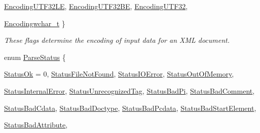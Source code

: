 \begin{DoxyCompactItemize}
\hyperlink{namespacephys_1_1xml_a420f5de782438f88160321385bea2015a127752883aaf8c9bdb5f66ec725211fc}{EncodingUTF32LE}, 
\hyperlink{namespacephys_1_1xml_a420f5de782438f88160321385bea2015a5fb13deaf1552b0f4c00e2b8cafce0b9}{EncodingUTF32BE}, 
\hyperlink{namespacephys_1_1xml_a420f5de782438f88160321385bea2015ac61c2f632bd66c2466c29783beb33f8a}{EncodingUTF32}, 
\par
\hyperlink{namespacephys_1_1xml_a420f5de782438f88160321385bea2015a2bc9c8d42796901c8feaa25e17c56cef}{Encodingwchar\_\-t}
 \}
\begin{DoxyCompactList}\small\item\em These flags determine the encoding of input data for an XML document. \item\end{DoxyCompactList}\item 
enum \hyperlink{namespacephys_1_1xml_ae7aabb879b21c73d8183a54470f8917f}{ParseStatus} \{ \par
\hyperlink{namespacephys_1_1xml_ae7aabb879b21c73d8183a54470f8917fa9ea9b3eecb4bb9f01745c94150982560}{StatusOk} =  0, 
\hyperlink{namespacephys_1_1xml_ae7aabb879b21c73d8183a54470f8917fa6f0279c8ce0103b77edcf3ce91fa64b4}{StatusFileNotFound}, 
\hyperlink{namespacephys_1_1xml_ae7aabb879b21c73d8183a54470f8917fa63f6d040311f50c1234a8eb873a0a95c}{StatusIOError}, 
\hyperlink{namespacephys_1_1xml_ae7aabb879b21c73d8183a54470f8917fac2a8163c9a8e285153d2a96b011bd49f}{StatusOutOfMemory}, 
\par
\hyperlink{namespacephys_1_1xml_ae7aabb879b21c73d8183a54470f8917fa458daab0a01f8dd3d0d85b4e41b9e187}{StatusInternalError}, 
\hyperlink{namespacephys_1_1xml_ae7aabb879b21c73d8183a54470f8917fabe0f4590debfa56c7e3a4c8da261b106}{StatusUnrecognizedTag}, 
\hyperlink{namespacephys_1_1xml_ae7aabb879b21c73d8183a54470f8917fa55afc9de133574f5c9376493c8e6fe09}{StatusBadPi}, 
\hyperlink{namespacephys_1_1xml_ae7aabb879b21c73d8183a54470f8917fa8f3864efd7b684ae57a8a7886a23f19a}{StatusBadComment}, 
\par
\hyperlink{namespacephys_1_1xml_ae7aabb879b21c73d8183a54470f8917fa18f36b8d712a6bbc716f90af8659df22}{StatusBadCdata}, 
\hyperlink{namespacephys_1_1xml_ae7aabb879b21c73d8183a54470f8917fa22f9163dc29ca7017022e4ce96c97ef9}{StatusBadDoctype}, 
\hyperlink{namespacephys_1_1xml_ae7aabb879b21c73d8183a54470f8917fab30b3a432145b0e9c6595e75da773628}{StatusBadPcdata}, 
\hyperlink{namespacephys_1_1xml_ae7aabb879b21c73d8183a54470f8917fadbc5b334b4215ce2332073de46c58155}{StatusBadStartElement}, 
\par
\hyperlink{namespacephys_1_1xml_ae7aabb879b21c73d8183a54470f8917fac5fdddc5cc4d127aa5c53efb85846ccf}{StatusBadAttribute}, 

\end{DoxyCompactItemize}
